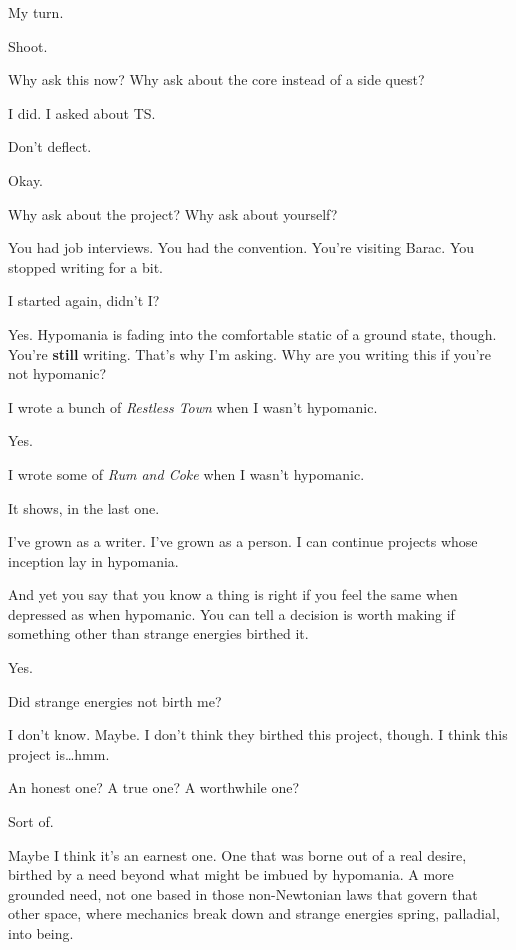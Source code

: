 \begin{paracol}{2}
  \begin{leftcolumn}

\noindent My turn.

\begin{ally}
Shoot.
\end{ally}
Why ask this now? Why ask about the core instead of a side quest?

\begin{ally}
I did. I asked about TS.
\end{ally}
Don't deflect.

\begin{ally}
Okay.
\end{ally}
Why ask about the project? Why ask about yourself?

\begin{ally}
You had job interviews. You had the convention. You're visiting Barac. You stopped writing for a bit.
\end{ally}
I started again, didn't I?

\begin{ally}
Yes. Hypomania is fading into the comfortable static of a ground state, though. You're \textbf{still} writing. That's why I'm asking. Why are you writing this if you're not hypomanic?
\end{ally}
I wrote a bunch of \emph{Restless Town} when I wasn't hypomanic.

\begin{ally}
Yes.
\end{ally}
I wrote some of \emph{Rum and Coke} when I wasn't hypomanic.

\begin{ally}
It shows, in the last one.
\end{ally}
I've grown as a writer. I've grown as a person. I can continue projects whose inception lay in hypomania.

\begin{ally}
And yet you say that you know a thing is right if you feel the same when depressed as when hypomanic. You can tell a decision is worth making if something other than strange energies birthed it.
\end{ally}
Yes.

\begin{ally}
Did strange energies not birth me?
\end{ally}
I don't know. Maybe. I don't think they birthed this project, though. I think this project is\ldots{}hmm.

\begin{ally}
An honest one? A true one? A worthwhile one?
\end{ally}
Sort of.

Maybe I think it's an earnest one. One that was borne out of a real desire, birthed by a need beyond what might be imbued by hypomania. A more grounded need, not one based in those non-Newtonian laws that govern that other space, where mechanics break down and strange energies spring, palladial, into being.
\newpage
\end{leftcolumn}
\end{paracol}
